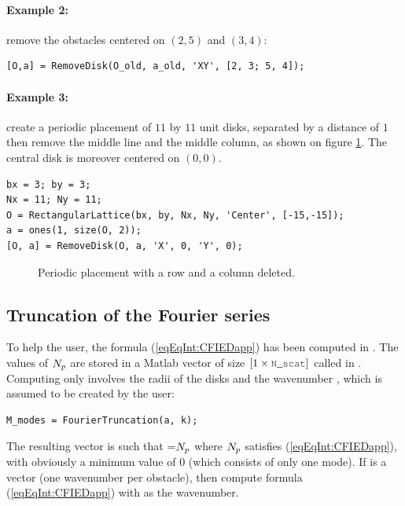 \paragraph{Example 2:} remove the obstacles centered on $(2,5)$ and $(3,4)$:
\begin{lstlisting}
[O,a] = RemoveDisk(O_old, a_old, 'XY', [2, 3; 5, 4]);
\end{lstlisting}
\paragraph{Example 3:} create a periodic placement of $11$ by $11$ unit disks, separated by a distance of $1$ then remove the middle line and the middle column, as shown on figure \ref{fig:removeDisks}. The central disk is moreover centered on $(0,0)$.
\begin{lstlisting}
bx = 3; by = 3;
Nx = 11; Ny = 11;
O = RectangularLattice(bx, by, Nx, Ny, 'Center', [-15,-15]);
a = ones(1, size(O, 2));
[O, a] = RemoveDisk(O, a, 'X', 0, 'Y', 0);
\end{lstlisting}

\begin{figure}
\centering
{}
\caption{Periodic placement with a row and a column deleted.}
\label{fig:removeDisks}
\end{figure}



\subsection{Truncation of the Fourier series}
\label{secFun:FourierTruncation}

To help the user, the formula (\ref{eqEqInt:CFIEDapp}) has been computed in \mudiff. The values of $N_{p}$ are stored in a Matlab vector of size $[1\times\code{N\_scat}]$ called  in \mudiff. Computing  only involves the radii of the disks and the wavenumber , which is assumed to be created by the user:
\begin{lstlisting}
M_modes = FourierTruncation(a, k);
\end{lstlisting}
The resulting vector is such that =$N_{p}$ where $N_{p}$ satisfies (\ref{eqEqInt:CFIEDapp}), with obviously a minimum value of $0$ (which consists of only one mode). If  is a vector (one wavenumber per obstacle), then \FourierTruncation compute formula (\ref{eqEqInt:CFIEDapp})  with  as the wavenumber.

